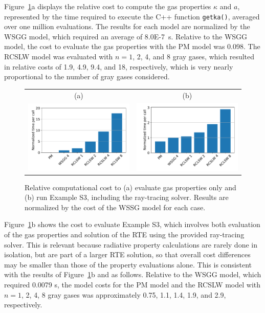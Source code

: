 \documentclass[preprint,12pt]{elsarticle}
\begin{document}
    Figure~\ref{f:cost}a displays the relative cost to compute the gas properties $\kappa$ and $a$, represented by the time required to execute the C++ function \texttt{get\textunderscore k\textunderscore a()}, averaged over one million evaluations. The results for each model are normalized by the WSGG model, which required an average of 8.0E-7~s. Relative to the WSGG model, the cost to evaluate the gas properties with the PM model was 0.098. The RCSLW model was evaluated with $n=1$, 2, 4, and 8 gray gases, which resulted in relative costs of 1.9, 4.9, 9.4, and 18, respectively, which is very nearly proportional to the number of gray gases considered.
%
    \begin{figure}
        \begin{center}
            \begin{tabular}{c c}
            (a)
                & (b) \\
                \includegraphics[width=2.5 in]{fig_getka_c++.pdf} &
                \includegraphics[width=2.5 in]{fig_exS3_c++.pdf}
            \end{tabular}
            \caption{Relative computational cost to (a) evaluate gas properties only and (b) run Example S3, including the ray-tracing solver. Results are normalized by the cost of the WSSG model for each case.}
            \label{f:cost}
        \end{center}
    \end{figure}
%

    Figure~\ref{f:cost}b shows the cost to evaluate Example S3, which involves both evaluation of the gas properties
    and solution of the RTE using the provided ray-tracing solver. This is relevant because radiative property
    calculations are rarely done in isolation, but are part of a larger RTE solution, so that overall cost
    differences may be smaller than those of the property evaluations alone. This is consistent with the results of
    Figure~\ref{f:cost}b and as follows. Relative to the WSGG model, which required 0.0079 s, the model costs for the
    PM model and the RCSLW model with $n=1$, 2, 4, 8 gray gases was approximately 0.75, 1.1, 1.4, 1.9, and 2.9, respectively.
\end{document}
